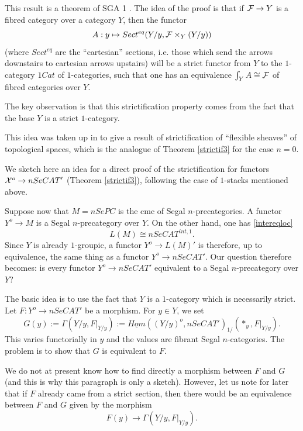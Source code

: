 This result is a theorem of SGA 1 \cite{SGA1}. The idea of the
proof is that if ${\cal F} \rightarrow Y$ is a fibred category
over a category $Y$, then the functor
$$
A:y\mapsto Sect^{eq} (Y/y, {\cal F} \times _Y(Y/y))
$$
(where $Sect^{eq}$ are the ``cartesian'' sections, i.e. those which send the
arrows downstairs to cartesian arrows upstairs) will be a strict functor from
$Y$ to
the $1$-category
$1Cat$ of $1$-categories, such that one has
an equivalence $\int _YA \cong {\cal F} $ of
fibred categories
over $Y$.

The key observation is that this strictification property comes
from the fact that the base $Y$ is a strict $1$-category.

This idea was taken up in \cite{flexible} to give a result of
strictification of ``flexible sheaves'' of topological spaces, which is
the analogue of Theorem \ref{strictif3} for the case $n=0$.


We sketch here an idea for a direct proof of the strictification
for functors ${\cal X} ^o \rightarrow nSeCAT'$ (Theorem \ref{strictif3}),
following the case of $1$-stacks mentioned above.

Suppose now that $M= nSePC$ is the cmc
of Segal $n$-precategories. A functor $Y ^o\rightarrow M$ is a
Segal $n$-precategory over $Y$. On the other hand, one has \ref{intereqloc}
$$
L(M) \cong nSeCAT ^{int, 1}.
$$
Since $Y$ is already $1$-groupic, a functor
$Y ^o \rightarrow L(M) '$ is therefore, up to equivalence, the same thing
as a functor $Y ^o\rightarrow nSeCAT '$. Our question therefore becomes: is
every functor $Y ^o\rightarrow nSeCAT'$ equivalent to
a Segal $n$-precategory over $Y$?

The basic idea is to use the fact that $Y$ is a $1$-category which is
necessarily strict.
Let $F: Y ^o \rightarrow nSeCAT'$ be a morphism. For
$y\in Y$, we set
$$
G(y):= \Gamma (Y/y, F|_{Y/y}):= \underline{Hom}((Y/y)^o,
nSeCAT')_{1/}(\ast _y,  F|_{Y/y}).
$$
This varies functorially in $y$ and the values are fibrant Segal
$n$-categories. The problem is to show that $G$ is equivalent
to $F$.

We do not at present know how to find directly a morphism
between
$F$ and $G$ (and this is why this paragraph is only a sketch).
However, let us note for later that if $F$ already came
from a strict section, then there
would be an equivalence between $F$ and $G$ given
by the morphism
$$
F(y)\rightarrow \Gamma (Y/y, F|_{Y/y}).
$$

